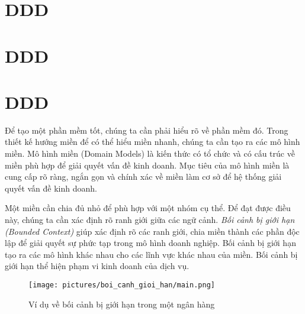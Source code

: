 \section{DDD}

\section{DDD}

\section{DDD}


Để tạo một phần mềm tốt, chúng ta cần phải hiểu rõ về phần mềm đó. Trong thiết kế hướng miền để có thể hiểu miền nhanh, chúng ta cần tạo ra các mô hình miền. Mô hình miền (Domain Models) là kiến thức có tổ chức và có cấu trúc về miền phù hợp để giải quyết vấn đề kinh doanh. Mục tiêu của mô hình miền là cung cấp rõ ràng, ngắn gọn và chính xác về miền làm cơ sở để hệ thống giải quyết vấn đề kinh doanh.




Một miền cần chia đủ nhỏ để phù hợp với một nhóm cụ thể. Để đạt được điều này, chúng ta cần xác định rõ ranh giới giữa các ngữ cảnh. \emph{Bối cảnh bị giới hạn (Bounded Context)} giúp xác định rõ các ranh giới, chia miền thành các phần độc lập để giải quyết sự phức tạp trong mô hình doanh nghiệp. Bối cảnh bị giới hạn tạo ra các mô hình khác nhau cho các lĩnh vực khác nhau của miền. Bối cảnh bị giới hạn thể hiện phạm vi kinh doanh của dịch vụ.

\begin{figure}[H]

\centering

\texttt{[image: pictures/boi\_canh\_gioi\_han/main.png]}

\caption{Ví dụ về bối cảnh bị giới hạn trong một ngân hàng}

\end{figure}

